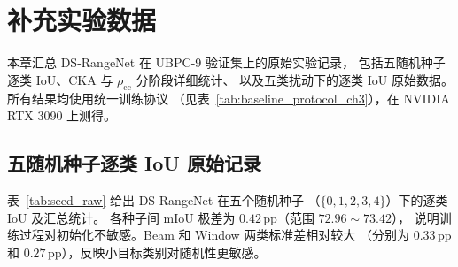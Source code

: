 \appendix

\chapter{补充实验数据}
\label{app:supplementary}

本章汇总 DS-RangeNet 在 UBPC-9 验证集上的原始实验记录，
包括五随机种子逐类 IoU、CKA 与 $\rho_{\mathrm{cc}}$ 分阶段详细统计、
以及五类扰动下的逐类 IoU 原始数据。所有结果均使用统一训练协议
（见表~\ref{tab:baseline_protocol_ch3}），在 NVIDIA RTX 3090 上测得。

\section{五随机种子逐类 IoU 原始记录}
\label{app:seed_iou}

表~\ref{tab:seed_raw} 给出 DS-RangeNet 在五个随机种子
（$\{0,1,2,3,4\}$）下的逐类 IoU 及汇总统计。
各种子间 mIoU 极差为 $0.42$\,pp（范围 $72.96\sim73.42$），
说明训练过程对初始化不敏感。Beam 和 Window 两类标准差相对较大
（分别为 $0.33$\,pp 和 $0.27$\,pp），反映小目标类别对随机性更敏感。

\begin{table}[htbp]
  \centering
  \caption[五随机种子逐类 IoU 原始数据]{DS-RangeNet 在 UBPC-9 验证集上五个随机种子的逐类 IoU（\%）。}
  \label{tab:seed_raw}
  \small
\end{table}

